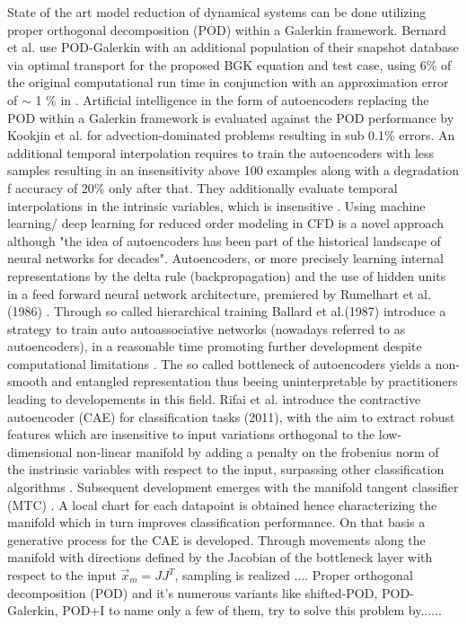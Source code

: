 State of the art model reduction of dynamical systems can be done utilizing proper orthogonal decomposition (POD) within a Galerkin framework. Bernard et al. use POD-Galerkin with an additional population of their snapshot database via optimal transport for the proposed BGK equation and test case, using 6\% of the original computational run time in conjunction with an approximation error of \(\sim\) 1 \% in \cite{Bernard}. Artificial intelligence in the form of autoencoders replacing the POD within a Galerkin framework is evaluated against the POD performance by Kookjin et al. for advection-dominated problems\cite{Carlberg} resulting in sub 0.1\% errors. An additional temporal interpolation requires to train the autoencoders with less samples resulting in an insensitivity above 100 examples along with a degradation f accuracy of 20\% only after that. They additionally evaluate temporal interpolations in the intrinsic variables,  which is insensitive . Using machine learning/ deep learning for reduced order modeling in CFD is a novel approach although "the idea of autoencoders has been part of the historical landscape of neural networks for decades"\cite[p.493]{Goodfellow}. Autoencoders, or more precisely learning internal representations by the delta rule (backpropagation) and the use of hidden units in a feed forward neural network architecture, premiered by Rumelhart et al. (1986) \cite{Rumelhart}.  Through so called hierarchical training Ballard et al.(1987) introduce a strategy to train auto autoassociative networks (nowadays referred to as autoencoders), in a reasonable time promoting further development despite computational limitations \cite{Ballard}. The so called bottleneck of autoencoders yields a non-smooth and entangled representation thus beeing uninterpretable by practitioners\cite{Rifai2011} leading to developements in this field. Rifai et al. introduce the contractive autoencoder (CAE) for classification tasks (2011), with the aim to extract robust features which are insensitive to input variations orthogonal to the low-dimensional non-linear manifold by adding a penalty on the frobenius norm of the instrinsic variables with respect to the input, surpassing other classification algorithms \cite{Rifai2011}. Subsequent development emerges with the manifold tangent classifier (MTC) \cite{Rifai_2011a}. A local chart for each datapoint is obtained hence characterizing the manifold  which in turn improves classification performance. On that basis a generative process for the CAE is developed. Through movements along the manifold with directions defined by the Jacobian of the bottleneck layer with respect to the input \begin{math}	\vec{x}_m=JJ^T \end{math}, sampling is realized \cite{rifai2012generative}....
Proper orthogonal decomposition (POD) and it's numerous variants like shifted-POD\cite{bibid}, POD-Galerkin\cite{bibid}, POD+I \cite{bibid} to name only a few of them, try to solve this problem by......	